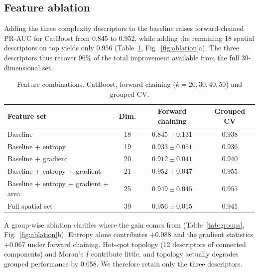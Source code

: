 \documentclass[preprint,12pt]{elsarticle}
\begin{document}
\subsection{Feature ablation}

Adding the three complexity descriptors to the baseline raises forward-chained PR-AUC for CatBoost from 0.845 to 0.952, while adding the remaining 18 spatial descriptors on top yields only 0.956 (Table~\ref{tab:combo}, Fig.~\ref{fig:ablation}a). The three descriptors thus recover 96\% of the total improvement available from the full 39-dimensional set.

\begin{table}[t]
\centering
\small\setlength{\tabcolsep}{4pt}
\caption{Feature combinations. CatBoost, forward chaining ($k=20,30,40,50$) and grouped CV.}
\label{tab:combo}
\begin{tabular}{lccc}
\toprule
Feature set & Dim. & Forward chaining & Grouped CV \\
\midrule
Baseline                       & 18 & $0.845 \pm 0.131$ & $0.938$ \\
Baseline + entropy             & 19 & $0.933 \pm 0.051$ & $0.936$ \\
Baseline + gradient            & 20 & $0.912 \pm 0.041$ & $0.940$ \\
Baseline + entropy + gradient  & 21 & $\mathbf{0.952 \pm 0.047}$ & $\mathbf{0.955}$ \\
Baseline + entropy + gradient + area & 25 & $0.949 \pm 0.045$ & $0.955$ \\
Full spatial set               & 39 & $0.956 \pm 0.015$ & $0.941$ \\
\bottomrule
\end{tabular}
\end{table}

A group-wise ablation clarifies where the gain comes from (Table~\ref{tab:groups}, Fig.~\ref{fig:ablation}b). Entropy alone contributes $+0.088$ and the gradient statistics $+0.067$ under forward chaining. Hot-spot topology (12 descriptors of connected components) and Moran's $I$ contribute little, and topology actually degrades grouped performance by 0.058. We therefore retain only the three descriptors.
\end{document}
